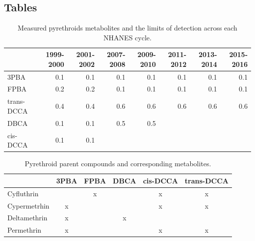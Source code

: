 
\newpage

\appendix
\section{}
\subsection{Tables}

\begin{table}[h]
\begin{adjustwidth}{-4cm}{}
\caption{Measured pyrethroids metabolites and the limits of detection across each NHANES cycle.}
\label{tab:tabs1}
\begin{tabular}{lrrrrrrr}
\toprule
  & 1999-2000 & 2001-2002 & 2007-2008 & 2009-2010 & 2011-2012 & 2013-2014 & 2015-2016\\
\midrule
3PBA & 0.1 & 0.1 & 0.1 & 0.1 & 0.1 & 0.1 & 0.1\\
FPBA & 0.2 & 0.2 & 0.1 & 0.1 & 0.1 & 0.1 & 0.1\\
trans-DCCA & 0.4 & 0.4 & 0.6 & 0.6 & 0.6 & 0.6 & 0.6\\
DBCA & 0.1 & 0.1 & 0.5 & 0.5 &  &  & \\
cis-DCCA & 0.1 & 0.1 &  &  &  &  & \\
\bottomrule
\end{tabular}
\end{adjustwidth}
\end{table}


\begin{table}[H]
\begin{adjustwidth}{-4cm}{}
\caption{\label{tab:tabs2}Pyrethroid parent compounds and corresponding metabolites.}
\begin{tabular}[t]{lccccc}
\toprule
  & 3PBA & FPBA & DBCA & cis-DCCA & trans-DCCA\\
\midrule
Cyfluthrin &  & x &  & x & x\\
Cypermetrhin & x &  &  & x & x\\
Deltamethrin & x &  & x &  & \\
Permethrin & x &  &  & x & x\\
\bottomrule
\end{tabular}
\end{adjustwidth}
\end{table}


